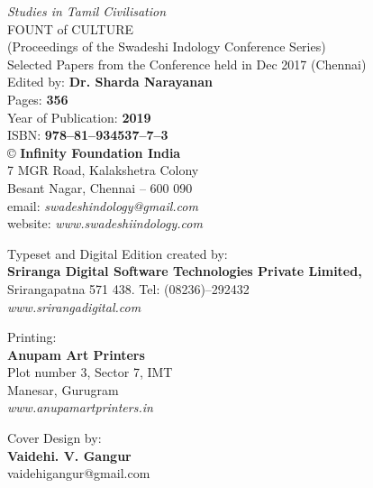 \thispagestyle{empty}

 \textit{Studies in Tamil Civilisation}\\
 FOUNT of CULTURE\\ 
 (Proceedings of the Swadeshi Indology Conference Series)\\
 Selected Papers from the Conference held in Dec 2017 (Chennai)\\
 Edited by: \textbf{Dr. Sharda Narayanan}\\

 Pages: \textbf{356}\\
 Year of Publication: \textbf{2019}\\
 ISBN: \textbf{978–81–934537–7–3}\\

 © \textbf{Infinity Foundation India}\\
 7 MGR Road, Kalakshetra Colony\\
 Besant Nagar, Chennai – 600 090\\
 email: \textit{swadeshindology@gmail.com}\\
 website: \textit{www.swadeshiindology.com}

 Typeset and Digital Edition created by:\\\textbf{Sriranga Digital Software Technologies Private Limited,}\\
 Srirangapatna 571 438. Tel: (08236)–292432\\\textit{www.srirangadigital.com}

 Printing:\\\textbf{Anupam Art Printers}\\
 Plot number 3, Sector 7, IMT\\
 Manesar, Gurugram\\\textit{www.anupamartprinters.in}

 Cover Design by:\\\textbf{Vaidehi. V. Gangur}\\
 vaidehigangur@gmail.com

